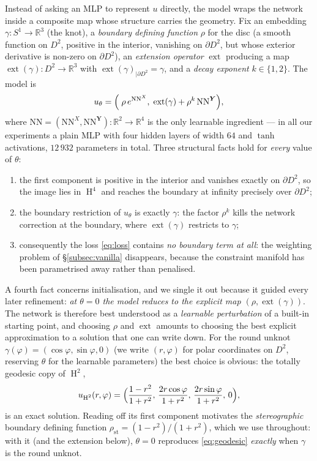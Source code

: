 \documentclass[oneside,british]{amsart}
\numberwithin{equation}{section}
\numberwithin{figure}{section}
\theoremstyle{plain}
\numberwithin{thm}{section}
\theoremstyle{plain}
\theoremstyle{plain}
\theoremstyle{definition}
\theoremstyle{remark}
\DeclareMathOperator{\HH}{\mathrm{H}}
\DeclareMathOperator{\ext}{\mathrm{ext}}
\newcommand{\NN}{\mathrm{NN}}
\begin{document}
Instead of asking an MLP to represent $u$ directly, the model wraps the
network inside a composite map whose structure carries the geometry.
Fix an embedding $\gamma:S^{1}\to\mathbb{R}^{3}$ (the knot), a
\emph{boundary defining function} $\rho$ for the disc (a smooth
function on $D^2$, positive in the interior, vanishing on
$\partial D^{2}$, but whose exterior derivative is non-zero on $\partial D^{2}$), an \emph{extension operator} $\ext$ producing a map
$\ext(\gamma):D^{2}\to\mathbb{R}^{3}$ with
$\ext(\gamma)_{|\partial D^{2}}=\gamma$, and a \emph{decay exponent}
$k\in\{1,2\}$. The model is
\begin{equation}
u_{\theta}=\Bigl(\;\rho\,e^{\NN^{X}},\;\ext(\gamma)+\rho^{k}\,\NN^{\boldsymbol{Y}}\Bigr),\label{eq:ansatz}
\end{equation}
where $\NN=(\NN^{X},\NN^{\boldsymbol{Y}}):\mathbb{R}^{2}\to\mathbb{R}^{4}$
is the only learnable ingredient --- in all our experiments a plain
MLP with four hidden layers of width $64$ and $\tanh$ activations,
$12\,932$ parameters in total. Three structural facts hold for
\emph{every} value of $\theta$:
\begin{enumerate}
\item the first component is positive in the interior and vanishes
exactly on $\partial D^{2}$, so the image lies in $\HH^{4}$ and reaches
the boundary at infinity precisely over $\partial D^{2}$;
\item the boundary restriction of $u_{\theta}$ is exactly $\gamma$: the
factor $\rho^{k}$ kills the network correction at the boundary, where
$\ext(\gamma)$ restricts to $\gamma$;
\item consequently the loss \eqref{eq:loss} contains \emph{no boundary
term at all}: the weighting problem of \S\ref{subsec:vanilla}
disappears, because the constraint manifold has been parametrised away
rather than penalised.
\end{enumerate}
A fourth fact concerns initialisation, and we single it out because it
guided every later refinement: \emph{at $\theta=0$ the model reduces to
the explicit map $(\rho,\ext(\gamma))$}. The network is therefore best
understood as a \emph{learnable perturbation} of a built-in starting
point, and choosing $\rho$ and $\ext$ amounts to choosing the best
explicit approximation to a solution that one can write down. For the
round unknot $\gamma(\varphi)=(\cos\varphi,\sin\varphi,0)$ (we write
$(r,\varphi)$ for polar coordinates on $D^{2}$, reserving $\theta$ for
the learnable parameters) the best choice is obvious: the totally
geodesic copy of $\HH^{2}$,
\begin{equation}
u_{\HH^{2}}(r,\varphi)=\Bigl(\frac{1-r^{2}}{1+r^{2}},\,\frac{2r\cos\varphi}{1+r^{2}},\,\frac{2r\sin\varphi}{1+r^{2}},\,0\Bigr),\label{eq:geodesic}
\end{equation}
is an exact solution. Reading off its first component motivates the
\emph{stereographic} boundary defining function
$\rho_{\mathrm{st}}=(1-r^{2})/(1+r^{2})$, which we use throughout: with
it (and the extension below), $\theta=0$ reproduces
\eqref{eq:geodesic} \emph{exactly} when $\gamma$ is the round unknot.
\end{document}
